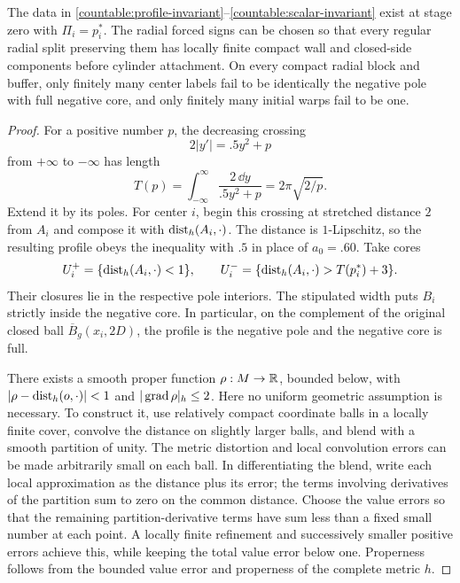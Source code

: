 \begin{lemma}\label{countable:initial}
The data in \eqref{countable:profile-invariant}--\eqref{countable:scalar-invariant}
exist at stage zero with $\Pi_i=p_i^*$. The radial forced signs can be
chosen so that every regular radial split preserving them has locally
finite compact wall and closed-side components before cylinder
attachment. On every compact radial block and buffer, only finitely
many center labels fail to be identically the negative pole with full
negative core, and only finitely many initial warps fail to be one.
\end{lemma}

\begin{proof}
For a positive number $p$, the decreasing crossing
\[
 2|y'|=.5y^2+p
\]
from $+\infty$ to $-\infty$ has length
\[
 T(p)=\int_{-\infty}^{\infty}\frac{2\,\dd y}{.5y^2+p}
      =2\pi\sqrt{2/p}.
\]
Extend it by its poles. For center $i$, begin this crossing at stretched
distance $2$ from $A_i$ and compose it with $\operatorname{dist}_h(A_i,\cdot)$.
The distance is $1$-Lipschitz, so the resulting profile obeys the
inequality with $.5$ in place of $a_0=.60$. Take cores
\[
 U_i^+=\{\operatorname{dist}_h(A_i,\cdot)<1\},\qquad
 U_i^-=\{\operatorname{dist}_h(A_i,\cdot)>T(p_i^*)+3\}.
\]
Their closures lie in the respective pole interiors. The stipulated
width puts $B_i$ strictly inside the negative core. In particular, on
the complement of the original closed ball $\overline B_g(x_i,2D)$,
the profile is the negative pole and the negative core is full.

There exists a smooth proper function $\rho:M\to\mathbb R$, bounded below,
with $|\rho-\operatorname{dist}_h(o,\cdot)|<1$ and $|\operatorname{grad}\rho|_h\le2$.
Here no uniform geometric assumption is necessary. To construct it,
use relatively compact coordinate balls in a locally finite cover,
convolve the distance on slightly larger balls, and blend with a
smooth partition of unity. The metric distortion and local convolution
errors can be made arbitrarily small on each ball. In differentiating
the blend, write each local approximation as the distance plus its
error; the terms involving derivatives of the partition sum to zero
on the common distance. Choose the value errors so that the remaining
partition-derivative terms have sum less than a fixed small number at
each point. A locally finite refinement and successively smaller
positive errors achieve this, while keeping the total value error
below one. Properness follows from the bounded value error and
properness of the complete metric $h$.


\end{proof}
